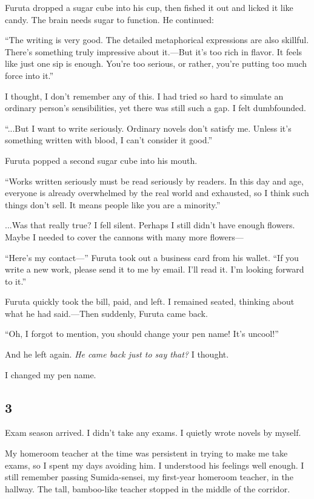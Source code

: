 \documentclass[
    a4paper,
    12pt,
    twoside,
    openany,
    UTF8,
    fontset=windows
]{ctexbook}
\begin{document}
Furuta dropped a sugar cube into his cup, then fished it out and licked it like candy. The brain needs sugar to function. He continued:

``The writing is very good. The detailed metaphorical expressions are also skillful. There's something truly impressive about it.---But it's too rich in flavor. It feels like just one sip is enough. You're too serious, or rather, you're putting too much force into it.''

I thought, I don't remember any of this. I had tried so hard to simulate an ordinary person's sensibilities, yet there was still such a gap. I felt dumbfounded.

``...But I want to write seriously. Ordinary novels don't satisfy me. Unless it's something written with blood, I can't consider it good.''

Furuta popped a second sugar cube into his mouth.

``Works written seriously must be read seriously by readers. In this day and age, everyone is already overwhelmed by the real world and exhausted, so I think such things don't sell. It means people like you are a minority.''

...Was that really true? I fell silent. Perhaps I still didn't have enough flowers. Maybe I needed to cover the cannons with many more flowers---

``Here's my contact---'' Furuta took out a business card from his wallet. ``If you write a new work, please send it to me by email. I'll read it. I'm looking forward to it.''

Furuta quickly took the bill, paid, and left. I remained seated, thinking about what he had said.---Then suddenly, Furuta came back.

``Oh, I forgot to mention, you should change your pen name! It's uncool!''

And he left again. \emph{He came back just to say that?} I thought.

I changed my pen name.


\subsection*{3}

Exam season arrived. I didn't take any exams. I quietly wrote novels by myself.

My homeroom teacher at the time was persistent in trying to make me take exams, so I spent my days avoiding him. I understood his feelings well enough. I still remember passing Sumida-sensei, my first-year homeroom teacher, in the hallway. The tall, bamboo-like teacher stopped in the middle of the corridor.
\end{document}
